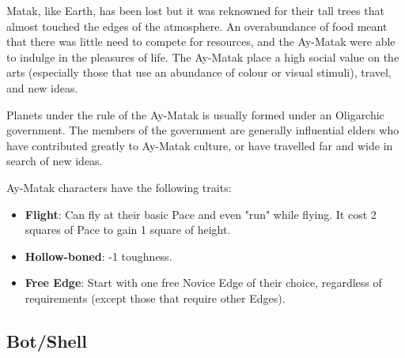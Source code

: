 \documentclass[10pt,twoside]{article}
\begin{document}
\begin{multicols}{2}
        Matak, like Earth, has been lost but it was reknowned for their tall trees that almost touched the edges of the atmosphere. An overabundance of food meant that there was little need to compete for resources, and the Ay-Matak were able to indulge in the pleasures of life. The Ay-Matak place a high social value on the arts (especially those that use an abundance of colour or visual stimuli), travel, and new ideas.

        Planets under the rule of the Ay-Matak is usually formed under an Oligarchic government. The members of the government are generally influential elders who have contributed greatly to Ay-Matak culture, or have travelled far and wide in search of new ideas.

        Ay-Matak characters have the following traits:

        \begin{itemize}
            \item \textbf{Flight}: Can fly at their basic Pace and even "run" while flying. It cost 2 squares of Pace to gain 1 square of height.

            \item \textbf{Hollow-boned}: -1 toughness.

            \item \textbf{Free Edge}: Start with one free Novice Edge of their choice, regardless of requirements (except those that require other Edges).
        \end{itemize}

        \subsection{Bot/Shell}
        

\end{multicols}
\end{document}
